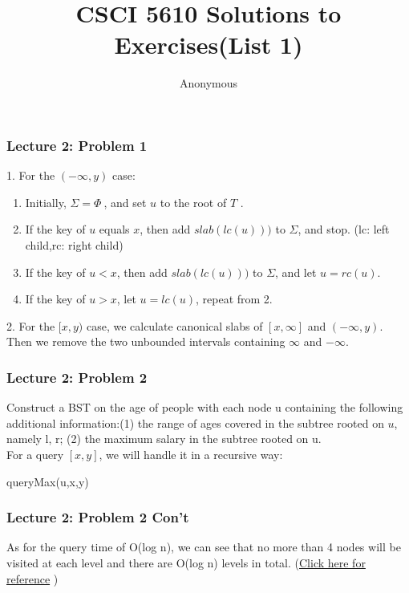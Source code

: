 \documentclass{beamer}
\title{CSCI 5610 Solutions to Exercises(List 1)}
\author{Anonymous}
\begin{document}
 
\begin{frame}
    \titlepage
\end{frame}
\begin{frame}
	\frametitle{Lecture 2: Problem 1}
	1. For the $(-\infty,y)$ case: \\
	\begin{enumerate}
		\item Initially, $ \Sigma = \Phi \ $, and set $ u $ to the root of $ T $ .
		\item If the key of $ u $ equals $ x $, then add $slab(lc(u)))$ to $ \Sigma $, and stop. (lc: left child,rc: right child)
		\item If the key of $ u  <  x $, then add $slab(lc(u)))$ to $ \Sigma $, and let $u = rc(u)$.
		\item If the key of $ u  >  x $, let $u = lc(u)$, repeat from 2.
	\end{enumerate}
	2. For the $ [x, y) $ case, we calculate canonical slabs of $ [x, \infty] $ and $ (-\infty,y).$ Then we remove the two unbounded intervals containing $ \infty  $ and $ -\infty $.
\end{frame}



\begin{frame}
	\frametitle{Lecture 2: Problem 2}
	Construct a BST on the age of people with each node u containing the following additional information:(1) the range of ages covered in the subtree rooted on $ u $, namely l, r; (2) the maximum salary in the subtree rooted on u.\\
	For a query $ [x,y] $, we will handle it in a recursive way:
	\begin{algorithm}[H]
		\begin{algorithmic}[1]
			  \ENDIF
			  \ENDIF
			  \ENDIF
		\end{algorithmic}
		\caption{queryMax(u,x,y)}
		
	\end{algorithm}

\end{frame}


\begin{frame}
	\frametitle{Lecture 2: Problem 2 Con't}
	As for the query time of O(log n), we can see that no more than 4 nodes will be visited at each level and there are O(log n) levels in total. (\href{https://www.quora.com/How-do-we-prove-that-the-time-complexity-of-the-update-and-query-operations-in-a-segment-tree-are-Theta-lg-n}{Click here for reference} )
	
\end{frame}
\end{document}

